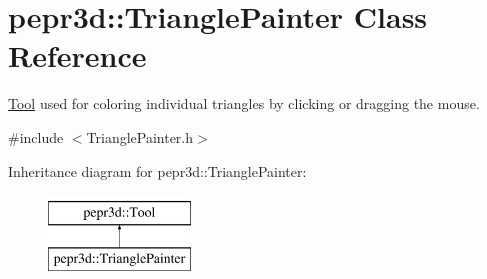 \hypertarget{classpepr3d_1_1_triangle_painter}{}\section{pepr3d\+::Triangle\+Painter Class Reference}
\label{classpepr3d_1_1_triangle_painter}


\mbox{\hyperlink{classpepr3d_1_1_tool}{Tool}} used for coloring individual triangles by clicking or dragging the mouse.  




{\ttfamily \#include $<$Triangle\+Painter.\+h$>$}

Inheritance diagram for pepr3d\+::Triangle\+Painter\+:\begin{figure}[H]
\begin{center}
\leavevmode
\includegraphics[height=2.000000cm]{classpepr3d_1_1_triangle_painter}
\end{center}
\end{figure}
